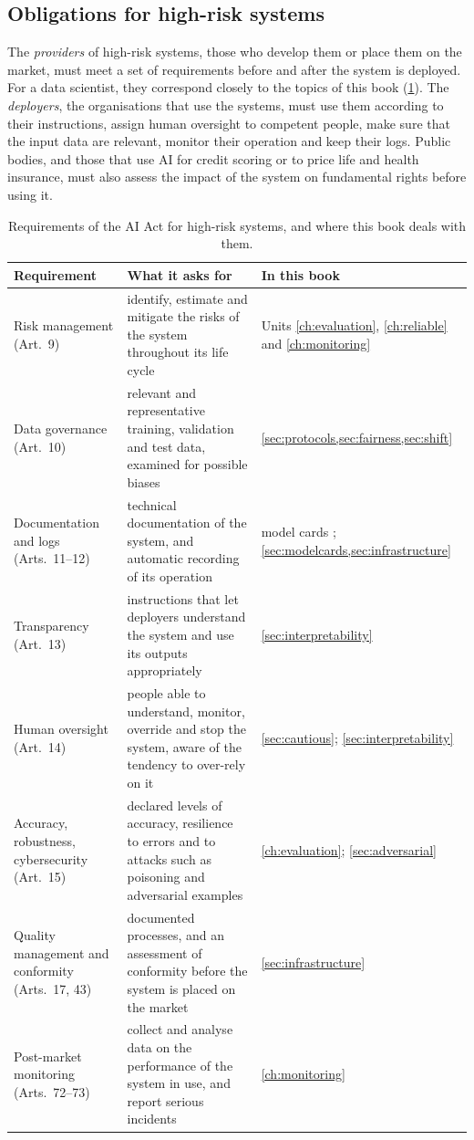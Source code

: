 \subsection{Obligations for high-risk systems}

The \emph{providers} of high-risk systems, those who develop them or place them on the market, must meet a set of
requirements before and after the system is deployed. For a data scientist, they correspond closely to the topics of this
book (\cref{tab:aiact}). The \emph{deployers}, the organisations that use the systems, must use them according to their
instructions, assign human oversight to competent people, make sure that the input data are relevant, monitor their
operation and keep their logs. Public bodies, and those that use AI for credit scoring or to price life and health
insurance, must also assess the impact of the system on fundamental rights before using it.

\begin{table}[htbp]
\centering\small
\caption{Requirements of the AI Act for high-risk systems, and where this book deals with them.}\label{tab:aiact}
\begin{tabularx}{\textwidth}{@{}>{\raggedright\arraybackslash}p{3.0cm}>{\raggedright\arraybackslash}X>{\raggedright\arraybackslash}p{3.1cm}@{}}
\toprule
Requirement & What it asks for & In this book\\
\midrule
Risk management (Art.~9) & identify, estimate and mitigate the risks of the system throughout its life cycle & Units
\ref{ch:evaluation}, \ref{ch:reliable} and \ref{ch:monitoring}\\
Data governance (Art.~10) & relevant and representative training, validation and test data, examined for possible
biases & \cref{sec:protocols,sec:fairness,sec:shift}\\
Documentation and logs (Arts.~11--12) & technical documentation of the system, and automatic recording of its operation
& model cards \citep{mitchell2019model}; \cref{sec:modelcards,sec:infrastructure}\\
Transparency (Art.~13) & instructions that let deployers understand the system and use its outputs appropriately &
\cref{sec:interpretability}\\
Human oversight (Art.~14) & people able to understand, monitor, override and stop the system, aware of the tendency to
over-rely on it & \cref{sec:cautious}; \cref{sec:interpretability}\\
Accuracy, robustness, cybersecurity (Art.~15) & declared levels of accuracy, resilience to errors and to attacks such as
poisoning and adversarial examples & \cref{ch:evaluation}; \cref{sec:adversarial}\\
Quality management and conformity (Arts.~17, 43) & documented processes, and an assessment of conformity before the system
is placed on the market & \cref{sec:infrastructure}\\
Post-market monitoring (Arts.~72--73) & collect and analyse data on the performance of the system in use, and report
serious incidents & \cref{ch:monitoring}\\
\bottomrule
\end{tabularx}
\end{table}

